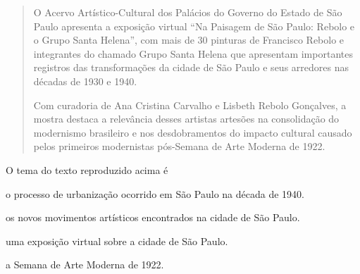 \begin{escolha}
\begin{quote}
O Acervo Artístico-Cultural dos Palácios do Governo do Estado de São
Paulo apresenta a exposição virtual ``Na Paisagem de São Paulo: Rebolo e
o Grupo Santa Helena'', com mais de 30 pinturas de Francisco Rebolo e
integrantes do chamado Grupo Santa Helena que apresentam importantes
registros das transformações da cidade de São Paulo e seus arredores nas
décadas de 1930 e 1940.

Com curadoria de Ana Cristina Carvalho e Lisbeth Rebolo Gonçalves, a
mostra destaca a relevância desses artistas artesões na consolidação do
modernismo brasileiro e nos desdobramentos do impacto cultural causado
pelos primeiros modernistas pós-Semana de Arte Moderna de 1922.
\end{quote}


O tema do texto reproduzido acima é

\begin{escolha}
  \item o processo de urbanização ocorrido em São Paulo na década de 1940.

  \item os novos movimentos artísticos encontrados na cidade de São Paulo.

  \item uma exposição virtual sobre a cidade de São Paulo.

  \item a Semana de Arte Moderna de 1922.
\end{escolha}



\end{escolha}
